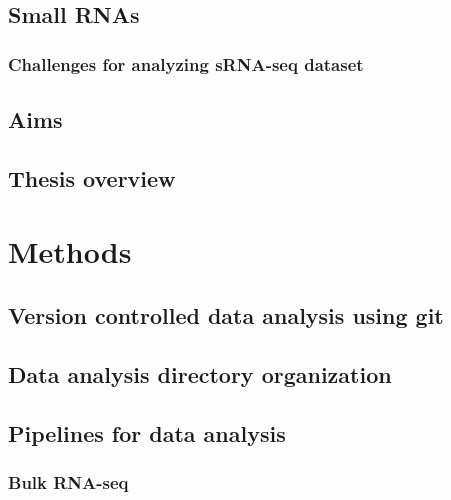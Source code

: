 \documentclass[12pt,twoside]{reedthesis}
\begin{document}
\hypertarget{small-rnas}{%
\section{Small RNAs}\label{small-rnas}}

\hypertarget{challenges-for-analyzing-srna-seq-dataset}{%
\subsection{Challenges for analyzing sRNA-seq dataset}\label{challenges-for-analyzing-srna-seq-dataset}}

\hypertarget{aims}{%
\section{Aims}\label{aims}}

\hypertarget{thesis-overview}{%
\section{Thesis overview}\label{thesis-overview}}

\hypertarget{methods}{%
\chapter*{Methods}\label{methods}}

\hypertarget{version-controlled-data-analysis-using-git}{%
\section{Version controlled data analysis using git}\label{version-controlled-data-analysis-using-git}}

\hypertarget{data-analysis-directory-organization}{%
\section{Data analysis directory organization}\label{data-analysis-directory-organization}}

\hypertarget{pipelines-for-data-analysis}{%
\section{Pipelines for data analysis}\label{pipelines-for-data-analysis}}

\hypertarget{bulk-rna-seq}{%
\subsection{Bulk RNA-seq}\label{bulk-rna-seq}}
\end{document}
